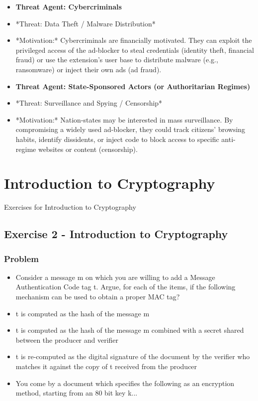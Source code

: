 \documentclass{article}
\begin{document}
\begin{itemize}
    \item[\textbf{1.}] \textbf{Threat Agent: Cybercriminals}
    \item *Threat: Data Theft / Malware Distribution*
    \item *Motivation:* Cybercriminals are financially motivated. They can exploit the privileged access of the ad-blocker to steal credentials (identity theft, financial fraud) or use the extension's user base to distribute malware (e.g., ransomware) or inject their own ads (ad fraud).

    \item[\textbf{2.}] \textbf{Threat Agent: State-Sponsored Actors (or Authoritarian Regimes)}
    \item *Threat: Surveillance and Spying / Censorship*
    \item *Motivation:* Nation-states may be interested in mass surveillance. By compromising a widely used ad-blocker, they could track citizens' browsing habits, identify dissidents, or inject code to block access to specific anti-regime websites or content (censorship).
\end{itemize}

\section{Introduction to Cryptography}
Exercises for Introduction to Cryptography

\subsection{Exercise 2 - Introduction to Cryptography}
\subsubsection*{Problem}
\begin{itemize}
    \item[\textbf{2.1}] Consider a message m on which you are willing to add a Message Authentication Code tag t. Argue, for each of the items, if the following mechanism can be used to obtain a proper MAC tag?
    \item[\textbf{1.}] t is computed as the hash of the message m
    \item[\textbf{2.}] t is computed as the hash of the message m combined with a secret shared between the producer and verifier
    \item[\textbf{3.}] t is re-computed as the digital signature of the document by the verifier who matches it against the copy of t received from the producer

    \item[\textbf{2.2}] You come by a document which specifies the following as an encryption method, starting from an 80 bit key k...
\end{itemize}
\end{document}
